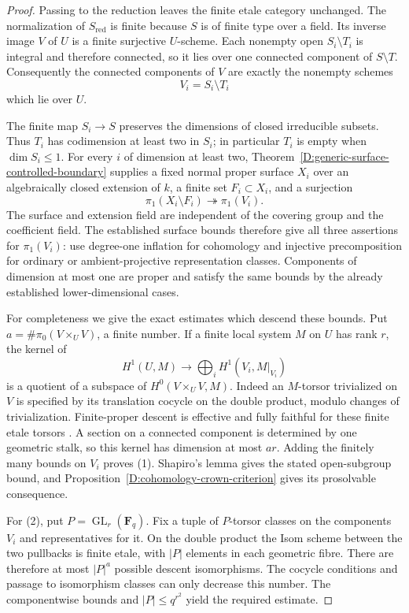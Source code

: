 \begin{proof}
Passing to the reduction leaves the finite etale category unchanged.
The normalization of $S_{\mathrm{red}}$ is finite because $S$ is
of finite type over a field.  Its inverse image $V$ of $U$ is a
finite surjective $U$-scheme.  Each nonempty open
$S_i\setminus T_i$ is integral and therefore connected, so it lies
over one connected component of $S\setminus T$.  Consequently the
connected components of $V$ are exactly the nonempty schemes
\[
                         V_i=S_i\setminus T_i
\]
which lie over $U$.

The finite map $S_i\to S$ preserves the dimensions of closed
irreducible subsets.  Thus $T_i$ has codimension at least two in
$S_i$; in particular $T_i$ is empty when $\dim S_i\le1$.
For every $i$ of dimension at least two,
Theorem~\ref{D:generic-surface-controlled-boundary} supplies a fixed
normal proper surface $X_i$ over an algebraically closed extension
of $k$, a finite set $F_i\subset X_i$, and a surjection
\[
                   \pi_1(X_i\setminus F_i)\twoheadrightarrow
                   \pi_1(V_i).
\]
The surface and extension field are independent of the covering
group and the coefficient field.  The established surface bounds
therefore give all three assertions for $\pi_1(V_i)$: use
degree-one inflation for cohomology and injective precomposition
for ordinary or ambient-projective representation classes.
Components of dimension at most one are proper and satisfy the
same bounds by the already established lower-dimensional cases.

For completeness we give the exact estimates which descend these
bounds.  Put $a=\#\pi_0(V\times_UV)$, a finite number.  If a finite
local system $M$ on $U$ has rank $r$, the kernel of
\[
 H^1(U,M)\longrightarrow\bigoplus_iH^1(V_i,M|_{V_i})
\]
is a quotient of a subspace of $H^0(V\times_UV,M)$.  Indeed an
$M$-torsor trivialized on $V$ is specified by its translation
cocycle on the double product, modulo changes of trivialization.
Finite-proper descent is effective and fully faithful for these
finite etale torsors \citep[Expose IX, Theorem 4.7]{C_SGA1}.
A section on a connected component is determined by one geometric
stalk, so this kernel has dimension at most $ar$.  Adding the
finitely many bounds on $V_i$ proves (1).  Shapiro's lemma gives
the stated open-subgroup bound, and
Proposition~\ref{D:cohomology-crown-criterion} gives its
prosolvable consequence.

For (2), put $P=\operatorname{GL}_r(\mathbf F_q)$.  Fix a tuple
of $P$-torsor classes on the components $V_i$ and representatives
for it.  On the double product the Isom scheme between the two
pullbacks is finite etale, with $|P|$ elements in each geometric
fibre.  There are therefore at most $|P|^a$ possible descent
isomorphisms.  The cocycle conditions and passage to isomorphism
classes can only decrease this number.  The componentwise bounds
and $|P|\le q^{r^2}$ yield the required estimate.


\end{proof}
